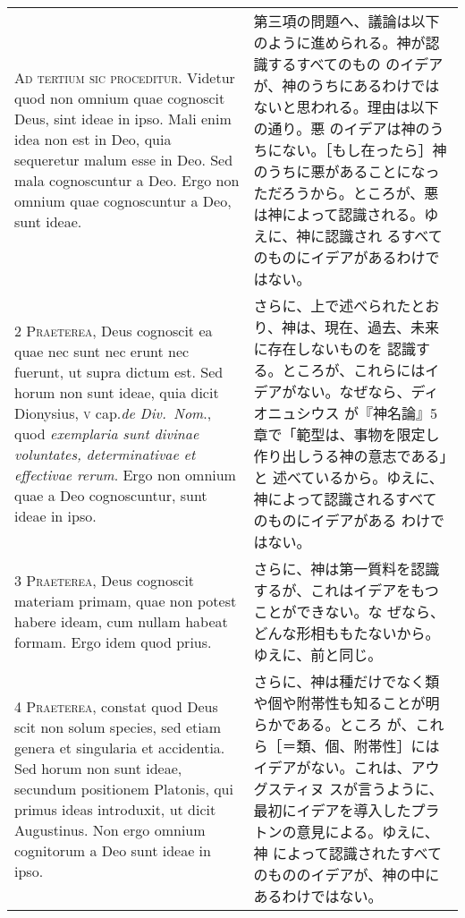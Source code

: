 \documentclass[10pt]{jsarticle} %
\begin{document}
\begin{longtable}{p{21em}p{21em}}

{\huge A}{\scshape d tertium sic proceditur}. Videtur quod non
omnium quae cognoscit Deus, sint ideae in ipso. Mali enim idea non est
in Deo, quia sequeretur malum esse in Deo. Sed mala cognoscuntur a
Deo. Ergo non omnium quae cognoscuntur a Deo, sunt ideae.

&

第三項の問題へ、議論は以下のように進められる。神が認識するすべてのもの
のイデアが、神のうちにあるわけではないと思われる。理由は以下の通り。悪
のイデアは神のうちにない。［もし在ったら］神のうちに悪があることになっ
ただろうから。ところが、悪は神によって認識される。ゆえに、神に認識され
るすべてのものにイデアがあるわけではない。

\\


{\scshape 2 Praeterea}, Deus cognoscit ea quae nec sunt nec erunt nec
fuerunt, ut supra dictum est. Sed horum non sunt ideae, quia dicit
Dionysius, {\scshape v} cap.{\itshape de Div.~Nom}., quod {\itshape
exemplaria sunt divinae voluntates, determinativae et effectivae
rerum}. Ergo non omnium quae a Deo cognoscuntur, sunt ideae in ipso.


&

さらに、上で述べられたとおり、神は、現在、過去、未来に存在しないものを
認識する。ところが、これらにはイデアがない。なぜなら、ディオニュシウス
が『神名論』5章で「範型は、事物を限定し作り出しうる神の意志である」と
述べているから。ゆえに、神によって認識されるすべてのものにイデアがある
わけではない。

\\

{\scshape 3 Praeterea}, Deus cognoscit materiam primam, quae non
potest habere ideam, cum nullam habeat formam. Ergo idem quod prius.

&

さらに、神は第一質料を認識するが、これはイデアをもつことができない。な
ぜなら、どんな形相ももたないから。ゆえに、前と同じ。

\\


{\scshape 4 Praeterea}, constat quod Deus scit non solum species, sed
etiam genera et singularia et accidentia. Sed horum non sunt ideae,
secundum positionem Platonis, qui primus ideas introduxit, ut dicit
Augustinus. Non ergo omnium cognitorum a Deo sunt ideae in ipso.

&

さらに、神は種だけでなく類や個や附帯性も知ることが明らかである。ところ
が、これら［＝類、個、附帯性］にはイデアがない。これは、アウグスティヌ
スが言うように、最初にイデアを導入したプラトンの意見による。ゆえに、神
によって認識されたすべてのもののイデアが、神の中にあるわけではない。


\end{longtable}
\end{document}
